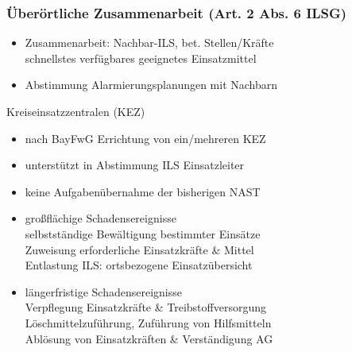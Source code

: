 \begin{normbox}{\subsubsection{Überörtliche Zusammenarbeit (Art. 2 Abs. 6 ILSG)}}
    \begin{itemize}
        \item Zusammenarbeit: Nachbar-ILS, bet. Stellen/Kräfte\\
        \ra schnellstes verfügbares geeignetes Einsatzmittel
        \item Abstimmung Alarmierungsplanungen mit Nachbarn
    \end{itemize}
\end{normbox}
 \begin{sectionbox}{Kreiseinsatzzentralen (KEZ)}
    \begin{itemize}
        \item nach BayFwG Errichtung von ein/mehreren KEZ
        \item unterstützt in Abstimmung ILS Einsatzleiter
        \item keine Aufgabenübernahme der bisherigen NAST
        \item großflächige Schadensereignisse\\
        \ra selbstständige Bewältigung bestimmter Einsätze\\
        \ra Zuweisung erforderliche Einsatzkräfte \& Mittel\\
        \ra Entlastung ILS: ortsbezogene Einsatzübersicht
        \item längerfristige Schadensereignisse\\
        \ra Verpflegung Einsatzkräfte \& Treibstoffversorgung\\
        \ra Löschmittelzuführung, Zuführung von Hilfsmitteln\\
        \ra Ablösung von Einsatzkräften \& Verständigung AG
    \end{itemize}
\end{sectionbox}